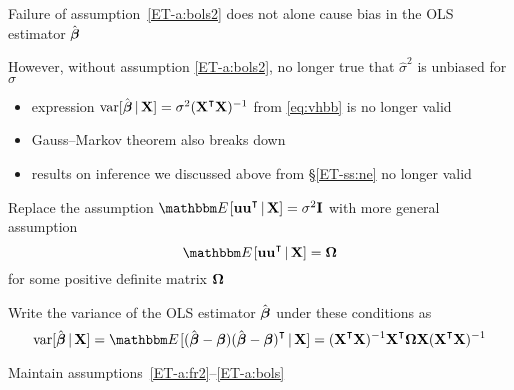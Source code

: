 \begin{frame}

    \vspace{2em}
    Failure of assumption~\ref{ET-a:bols2} does not alone cause bias in the OLS
    estimator $\hat {\boldsymbol \beta}$
    
    \vspace{.7em}
    However, without assumption \ref{ET-a:bols2}, no longer true that
    $ \hat \sigma^2$ is unbiased for $\sigma$
    \begin{itemize}
        \item expression $\var [\hboldbeta \given \boldX]
    = \sigma^2 (\boldX^\T \boldX)^{-1}$ from \eqref{eq:vhbb} is no longer valid
        \item Gauss--Markov theorem also breaks down
        \item results on inference we discussed above from \S\ref{ET-ss:ne} no longer valid
    \end{itemize}
    
\end{frame}

\begin{frame}

    \vspace{2em}
    Replace the assumption $\EE [ \boldu \boldu^\T
    \given \boldX ] = \sigma^2 \boldI$ with more general assumption 
    \begin{equation}
        \label{eq:glsa}
        \EE [ \boldu \boldu^\T \given \boldX ] = \boldOmega  
    \end{equation}
    for some positive definite matrix ${\boldsymbol \Omega}$
    
    \vspace{.7em}
    Write the variance of the OLS estimator
    $\hat {\boldsymbol \beta}$ under these conditions as
    \begin{equation*}
        \label{eq:genvar}
        \var [\hboldbeta \given \boldX]
        \\ = \EE [ (\hboldbeta - \boldbeta)(\hboldbeta - \boldbeta)^\T \given \boldX]
        = (\boldX^\T \boldX)^{-1} \boldX^\T \boldOmega  \boldX
            (\boldX^\T \boldX)^{-1}
    \end{equation*}
    
    Maintain assumptions~\ref{ET-a:fr2}--\ref{ET-a:bols}
    
\end{frame}

